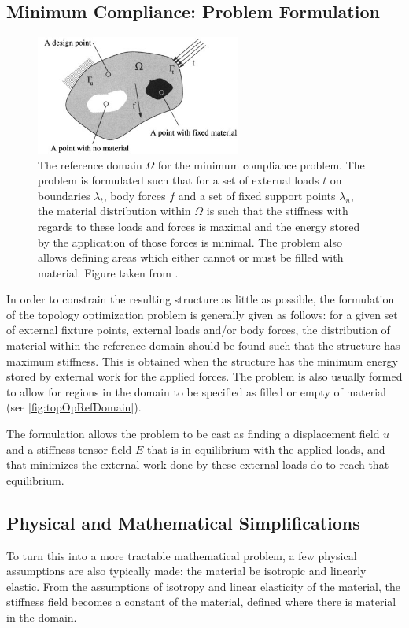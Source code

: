 \subsection{Minimum Compliance: Problem Formulation}
\label{subsec:TopOpTheory}
\begin{figure}
\centering
\includegraphics[width=0.6\textwidth]{Pictures/TopOp/design_domain.png}
\caption{The reference domain $\Omega$ for the minimum compliance problem. The problem is formulated such that for a set of external loads $t$ on boundaries $\lambda_t$, body forces $f$ and a set of fixed support points $\lambda_u$, the material distribution within $\Omega$ is such that the stiffness with regards to these loads and forces is maximal and the energy stored by the application of those forces is minimal. The problem also allows defining areas which either cannot or must be filled with material. Figure taken from \cite{bendsoe2003topology}.}
\label{fig:topOpRefDomain}
\end{figure}
In order to constrain the resulting structure as little as possible, the formulation of the topology optimization problem is generally given as follows: for a given set of external fixture points, external loads and/or body forces, the distribution of material within the reference domain should be found such that the structure has maximum stiffness. This is obtained when the structure has the minimum energy stored by external work for the applied forces. The problem is also usually formed to allow for regions in the domain to be specified as filled or empty of material (see \autoref{fig:topOpRefDomain}). 

The formulation allows the problem to be cast as finding a displacement field $u$ and a stiffness tensor field $E$ that is in equilibrium with the applied loads, and that minimizes the external work done by these external loads do to reach that equilibrium. 

\subsection{Physical and Mathematical Simplifications}
To turn this into a more tractable mathematical problem, a few physical assumptions are also typically made: the material be isotropic and linearly elastic. From the assumptions of isotropy and linear elasticity of the material, the stiffness field becomes a constant of the material, defined where there is material in the domain.

